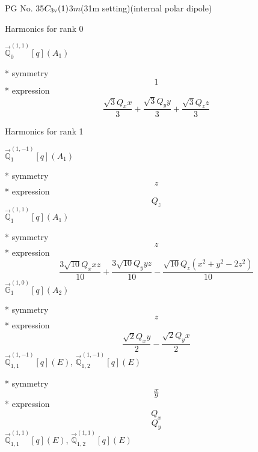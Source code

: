 \documentclass[fleqn,8pt]{jsarticle}
\begin{document}
\setcounter{MaxMatrixCols}{32}

\renewcommand{\tablename}{Table~}
\renewcommand{\figurename}{Figure~}
\begin{center}
\LARGE
PG No. 35\quad$C_{\rm 3v}(1)$\quad$3m$\quad(31m setting)\quad[ trigonal ] (internal polar dipole)
\end{center}

\noindent * Harmonics for rank 0

\noindent\quad $\vec{\mathbb{Q}}_{0}^{(1,1)}[q](A_{1})$

\noindent\quad ** symmetry
\begin{dmath*}
1
\end{dmath*}
\noindent\quad ** expression
\begin{dmath*}
\frac{\sqrt{3} Q_{x} x}{3} + \frac{\sqrt{3} Q_{y} y}{3} + \frac{\sqrt{3} Q_{z} z}{3}
\end{dmath*}

\noindent * Harmonics for rank 1

\noindent\quad $\vec{\mathbb{Q}}_{1}^{(1,-1)}[q](A_{1})$

\noindent\quad ** symmetry
\begin{dmath*}
z
\end{dmath*}
\noindent\quad ** expression
\begin{dmath*}
Q_{z}
\end{dmath*}
\noindent\quad $\vec{\mathbb{Q}}_{1}^{(1,1)}[q](A_{1})$

\noindent\quad ** symmetry
\begin{dmath*}
z
\end{dmath*}
\noindent\quad ** expression
\begin{dmath*}
\frac{3 \sqrt{10} Q_{x} x z}{10} + \frac{3 \sqrt{10} Q_{y} y z}{10} - \frac{\sqrt{10} Q_{z} \left(x^{2} + y^{2} - 2 z^{2}\right)}{10}
\end{dmath*}
\noindent\quad $\vec{\mathbb{G}}_{1}^{(1,0)}[q](A_{2})$

\noindent\quad ** symmetry
\begin{dmath*}
z
\end{dmath*}
\noindent\quad ** expression
\begin{dmath*}
\frac{\sqrt{2} Q_{x} y}{2} - \frac{\sqrt{2} Q_{y} x}{2}
\end{dmath*}
\noindent\quad $\vec{\mathbb{Q}}_{1,1}^{(1,-1)}[q](E)$, $\vec{\mathbb{Q}}_{1,2}^{(1,-1)}[q](E)$

\noindent\quad ** symmetry
\begin{dmath*}
x
\end{dmath*}
\begin{dmath*}
y
\end{dmath*}
\noindent\quad ** expression
\begin{dmath*}
Q_{x}
\end{dmath*}
\begin{dmath*}
Q_{y}
\end{dmath*}
\noindent\quad $\vec{\mathbb{Q}}_{1,1}^{(1,1)}[q](E)$, $\vec{\mathbb{Q}}_{1,2}^{(1,1)}[q](E)$
\end{document}
